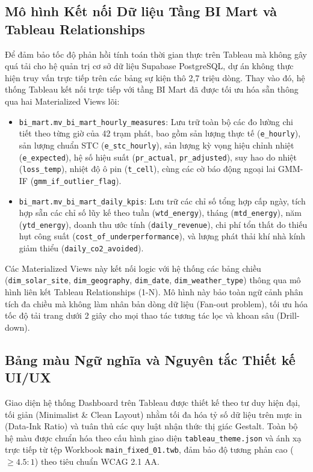 \documentclass[12pt, a4paper]{report}
\begin{document}
\subsection{Mô hình Kết nối Dữ liệu Tầng BI Mart và Tableau Relationships}
\label{subsec:bi_mart_model}

Để đảm bảo tốc độ phản hồi tính toán thời gian thực trên Tableau mà không gây quá tải cho hệ quản trị cơ sở dữ liệu Supabase PostgreSQL, dự án không thực hiện truy vấn trực tiếp trên các bảng sự kiện thô 2,7 triệu dòng. Thay vào đó, hệ thống Tableau kết nối trực tiếp với tầng BI Mart đã được tối ưu hóa sẵn thông qua hai Materialized Views lõi:
\begin{itemize}
    \item \texttt{bi\_mart.\allowbreak mv\_bi\_mart\_hourly\_measures}: Lưu trữ toàn bộ các đo lường chi tiết theo từng giờ của 42 trạm phát, bao gồm sản lượng thực tế (\texttt{e\_hourly}), sản lượng chuẩn STC (\texttt{e\_stc\_hourly}), sản lượng kỳ vọng hiệu chỉnh nhiệt (\texttt{e\_expected}), hệ số hiệu suất (\texttt{pr\_actual}, \texttt{pr\_adjusted}), suy hao do nhiệt (\texttt{loss\_temp}), nhiệt độ ô pin (\texttt{t\_cell}), cùng các cờ báo động ngoại lai GMM-IF (\texttt{gmm\_if\_outlier\_flag}).
    \item \texttt{bi\_mart.\allowbreak mv\_bi\_mart\_daily\_kpis}: Lưu trữ các chỉ số tổng hợp cấp ngày, tích hợp sẵn các chỉ số lũy kế theo tuần (\texttt{wtd\_energy}), tháng (\texttt{mtd\_energy}), năm (\texttt{ytd\_energy}), doanh thu ước tính (\texttt{daily\_revenue}), chi phí tổn thất do thiếu hụt công suất (\texttt{cost\_of\_underperformance}), và lượng phát thải khí nhà kính giảm thiểu (\texttt{daily\_co2\_avoided}).
\end{itemize}

Các Materialized Views này kết nối logic với hệ thống các bảng chiều (\texttt{dim\_solar\_site}, \texttt{dim\_geography}, \texttt{dim\_date}, \texttt{dim\_weather\_type}) thông qua mô hình liên kết Tableau Relationships (1-N). Mô hình này bảo toàn ngữ cảnh phân tích đa chiều mà không làm nhân bản dòng dữ liệu (Fan-out problem), tối ưu hóa tốc độ tải trang dưới 2 giây cho mọi thao tác tương tác lọc và khoan sâu (Drill-down).

\subsection{Bảng màu Ngữ nghĩa và Nguyên tắc Thiết kế UI/UX}
\label{subsec:color_palette}

Giao diện hệ thống Dashboard trên Tableau được thiết kế theo tư duy hiện đại, tối giản (Minimalist \& Clean Layout) nhằm tối đa hóa tỷ số dữ liệu trên mực in (Data-Ink Ratio) và tuân thủ các quy luật nhận thức thị giác Gestalt. Toàn bộ hệ màu được chuẩn hóa theo cấu hình giao diện \texttt{tableau\_theme.json} và ánh xạ trực tiếp từ tệp Workbook \texttt{main\_fixed\_01.twb}, đảm bảo độ tương phản cao ($\ge 4.5:1$) theo tiêu chuẩn WCAG 2.1 AA.
\end{document}
